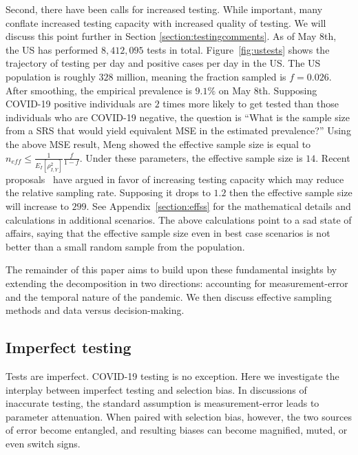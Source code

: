 \documentclass[aoas]{amsart}
\begin{document}
Second, there have been calls for increased testing.  While important, many conflate increased testing capacity with increased quality of testing.  We will discuss this point further in Section \ref{section:testingcomments}.  As of May 8th, the US has performed $8,412,095$ tests in total.  Figure~\ref{fig:ustests} shows the trajectory of testing per day and positive cases per day in the US.  The US population is roughly $328$ million, meaning the fraction sampled is $f = 0.026$.  After smoothing, the empirical prevalence is $9.1\%$ on May 8th.  Supposing COVID-19 positive individuals are $2$ times more likely to get tested than those individuals who are COVID-19 negative, the question is ``What is the sample size from a SRS that would yield equivalent MSE in the estimated prevalence?'' Using the above MSE result, Meng showed the effective sample size is equal to $n_{eff} \leq \frac{1}{E_I [ \rho_{I,Y}^2 ]} \frac{f}{1-f}$.  Under these parameters, the effective sample size is $14$.  Recent proposals~\citep{Siddarth2020} have argued in favor of increasing testing capacity which may reduce the relative sampling rate.  Supposing it drops to $1.2$ then the effective sample size will increase to $299$.  See Appendix~\ref{section:effss} for the mathematical details and calculations in additional scenarios.   The above calculations point to a sad state of affairs, saying that the effective sample size even in best case scenarios is not better than a small random sample from the population.

The remainder of this paper aims to build upon these fundamental insights by extending the decomposition in two directions: accounting for  measurement-error and the temporal nature of the pandemic.  We then discuss effective sampling methods and data versus decision-making.

\subsection{Imperfect testing}

Tests are imperfect.  COVID-19 testing is no exception. Here we investigate the interplay between imperfect testing and selection bias.  In discussions of inaccurate testing, the standard assumption is measurement-error leads to parameter attenuation.  When paired with selection bias, however, the two sources of error become entangled, and resulting biases can become magnified, muted, or even switch signs.
\end{document}
